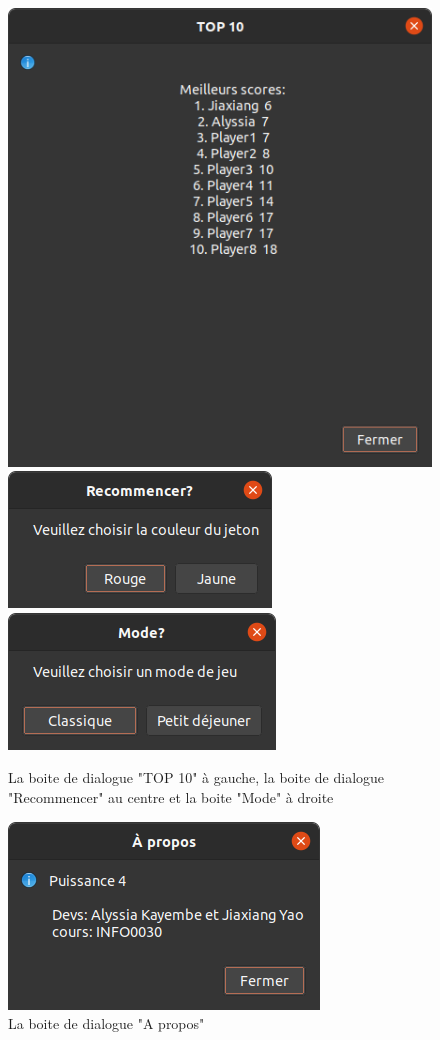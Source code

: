 \documentclass[a4paper, 11pt, oneside]{article}
\begin{document}
\begin{figure}[h]
    \center
    \includegraphics[scale = 0.35]{image4.png}
    \includegraphics[scale = 0.50]{image5.png}
    \includegraphics[scale = 0.50]{image10.png}
    \caption{La boite de dialogue "TOP 10" à gauche, la boite de dialogue "Recommencer" au  centre et la boite "Mode" à droite}
\end{figure}

\begin{figure}[!h]
    \center
    \includegraphics[scale = 0.50]{image6.png}
    \caption{La boite de dialogue "A propos"}
\end{figure}
\end{document}
